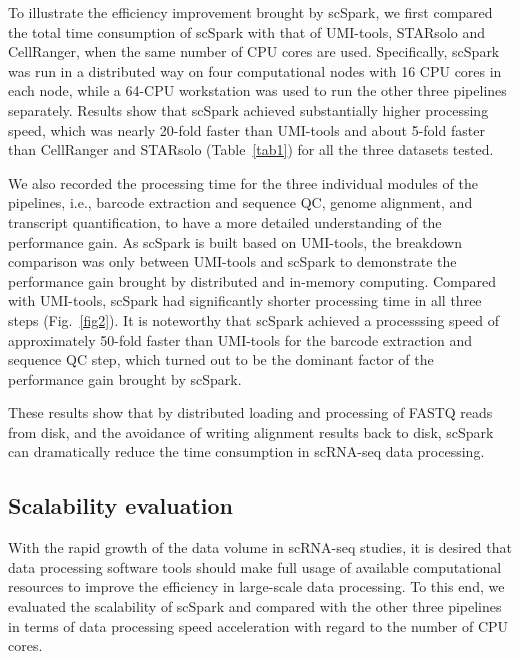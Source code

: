 \documentclass[conference]{IEEEtran}
\begin{document}
To illustrate the efficiency improvement brought by scSpark, we first compared the total time consumption of scSpark with that of UMI-tools, STARsolo and CellRanger, when the same number of CPU cores are used. Specifically, scSpark was run in a distributed way on four computational nodes with 16 CPU cores in each node, while a 64-CPU workstation was used to run the other three pipelines separately. 
Results show that scSpark achieved substantially higher processing speed, which was nearly 20-fold faster than UMI-tools and about 5-fold faster than CellRanger and STARsolo (Table~\ref{tab1}) for all the three datasets tested.  

We also recorded the processing time for the three individual modules of the pipelines, i.e., barcode extraction and sequence QC, genome alignment, and transcript quantification, to have a more detailed understanding of the performance gain. 
As scSpark is built based on UMI-tools, the breakdown comparison was only between UMI-tools and scSpark to demonstrate the performance gain brought by distributed and in-memory computing. 
Compared with UMI-tools, scSpark had significantly shorter processing time in all three steps (Fig.~\ref{fig2}).
It is noteworthy that scSpark achieved a processsing speed of approximately 50-fold faster than UMI-tools for the barcode extraction and sequence QC step, which turned out to be the dominant factor of the performance gain brought by scSpark. 

These results show that by distributed loading and processing of FASTQ reads from disk, and the avoidance of writing alignment results back to disk, scSpark can dramatically reduce the time consumption in scRNA-seq data processing. 

\subsection{Scalability evaluation}
With the rapid growth of the data volume in scRNA-seq studies, it is desired that data processing software tools should make full usage of available computational resources to improve the efficiency in large-scale data processing. To this end, we evaluated the scalability of scSpark and compared with the other three pipelines in terms of data processing speed acceleration with regard to the number of CPU cores.
\end{document}
